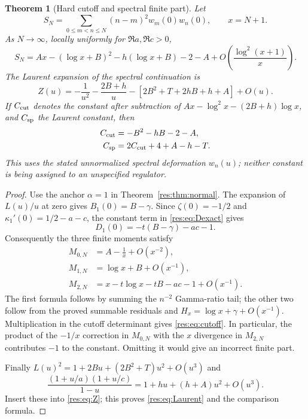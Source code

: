 \documentclass[11pt,letterpaper]{article}
\numberwithin{equation}{section}
\theoremstyle{plain}
\newtheorem{theorem}{Theorem}[section]
\theoremstyle{definition}
\theoremstyle{remark}
\begin{document}
\begin{theorem}[Hard cutoff and spectral finite part]
\label{res:thm:cutoff}
Let
\[
 S_N=\sum_{0\leq m<n\leq N}(n-m)^2w_m(0)w_n(0),\qquad x=N+1.
\]
As $N\to\infty$, locally uniformly for $\Re a,\Re c>0$,
\begin{equation}
 \boxed{S_N=A x-(\log x+B)^2-h(\log x+B)-2-A
             +O\left(\frac{\log^2(x+1)}x\right).}
 \label{res:eq:cutoff}
\end{equation}
The Laurent expansion of the spectral continuation is
\begin{equation}
 Z(u)=-\frac1{u^2}-\frac{2B+h}u
       -\left[2B^2+T+2hB+h+A\right]+O(u).
 \label{res:eq:Laurent}
\end{equation}
If $C_{\rm cut}$ denotes the constant after subtraction of
$Ax-\log^2x-(2B+h)\log x$, and $C_{\rm sp}$ the Laurent constant,
then
\begin{align}
 C_{\rm cut}&=-B^2-hB-2-A,\label{res:eq:Ccut}\\
 C_{\rm sp}&=2C_{\rm cut}+4+A-h-T.\label{res:eq:compare}
\end{align}
This uses the stated unnormalized spectral deformation $w_n(u)$;
neither constant is being assigned to an unspecified regulator.
\end{theorem}

\begin{proof}
Use the anchor $\alpha=1$ in Theorem~\ref{res:thm:normal}.
The expansion of $L(u)/u$ at zero gives
$B_1(0)=B-\gamma$.  Since $\zeta(0)=-1/2$ and
$\kappa_1'(0)=1/2-a-c$, the constant term in
\eqref{res:eq:Dexact} gives
\[
 D_1(0)=-t(B-\gamma)-ac-1.
\]
Consequently the three finite moments satisfy
\begin{align*}
 M_{0,N}&=A-\frac1x+O(x^{-2}),\\
 M_{1,N}&=\log x+B+O(x^{-1}),\\
 M_{2,N}&=x-t\log x-tB-ac-1+O(x^{-1}).
\end{align*}
The first formula follows by summing the $n^{-2}$ Gamma-ratio
tail; the other two follow from the proved summable residuals and
$H_x=\log x+\gamma+O(x^{-1})$.  Multiplication in the cutoff
determinant gives \eqref{res:eq:cutoff}.  In particular, the product
of the $-1/x$ correction in $M_{0,N}$ with the $x$ divergence in
$M_{2,N}$ contributes $-1$ to the constant.  Omitting it would give
an incorrect finite part.

Finally $L(u)^2=1+2Bu+(2B^2+T)u^2+O(u^3)$ and
\[
 \frac{(1+u/a)(1+u/c)}{1-u}
   =1+hu+(h+A)u^2+O(u^3).
\]
Insert these into \eqref{res:eq:Z}; this proves
\eqref{res:eq:Laurent} and the comparison formula.
\end{proof}
\end{document}
